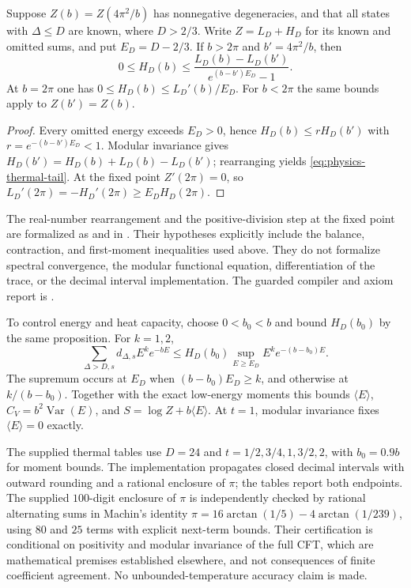 \begin{proposition}
\label{prop:physics-modular-tail}
Suppose $Z(b)=Z(4\pi^2/b)$ has nonnegative degeneracies, and that all
states with $\Delta\leq D$ are known, where $D>2/3$.  Write
$Z=L_D+H_D$ for its known and omitted sums, and put
$E_D=D-2/3$.  If $b>2\pi$ and $b'=4\pi^2/b$, then
\begin{equation}\label{eq:physics-thermal-tail}
 0\leq H_D(b)\leq
 \frac{L_D(b)-L_D(b')}{e^{(b-b')E_D}-1}.
\end{equation}
At $b=2\pi$ one has
$0\leq H_D(b)\leq L_D'(b)/E_D$.
For $b<2\pi$ the same bounds apply to $Z(b')=Z(b)$.
\end{proposition}
\begin{proof}
Every omitted energy exceeds $E_D>0$, hence
$H_D(b)\leq rH_D(b')$ with $r=e^{-(b-b')E_D}<1$.
Modular invariance gives
$H_D(b')=H_D(b)+L_D(b)-L_D(b')$; rearranging yields
\eqref{eq:physics-thermal-tail}.  At the fixed point $Z'(2\pi)=0$,
so $L_D'(2\pi)=-H_D'(2\pi)\geq E_DH_D(2\pi)$.
\end{proof}

The real-number rearrangement and the positive-division step at the
fixed point are formalized as
 and
 in
.
Their hypotheses explicitly include the balance, contraction, and
first-moment inequalities used above. They do not formalize spectral
convergence, the modular functional equation, differentiation of
the trace, or the decimal interval implementation. The guarded
compiler and axiom report is
.

To control energy and heat capacity, choose $0<b_0<b$ and bound
$H_D(b_0)$ by the same proposition.  For $k=1,2$,
\begin{equation}\label{eq:physics-moment-tail}
 \sum_{\Delta>D,s}d_{\Delta,s}E^ke^{-bE}
 \leq H_D(b_0)\sup_{E\geq E_D}E^ke^{-(b-b_0)E}.
\end{equation}
The supremum occurs at $E_D$ when $(b-b_0)E_D\geq k$, and otherwise
at $k/(b-b_0)$.  Together with the exact low-energy moments this bounds
$\langle E\rangle$, $C_V=b^2\operatorname{Var}(E)$, and
$S=\log Z+b\langle E\rangle$.  At $t=1$, modular invariance fixes
$\langle E\rangle=0$ exactly.

The supplied thermal tables use $D=24$ and
$t=1/2,3/4,1,3/2,2$, with $b_0=0.9b$ for moment bounds.
The implementation propagates closed decimal intervals with outward
rounding and a rational enclosure of $\pi$; the tables report both
endpoints. The supplied $100$-digit enclosure of $\pi$ is independently
checked by rational alternating sums in Machin's identity
$\pi=16\arctan(1/5)-4\arctan(1/239)$, using $80$ and $25$ terms
with explicit next-term bounds. Their certification is conditional on positivity and
modular invariance of the full CFT, which are mathematical premises
established elsewhere, and not consequences of finite coefficient
agreement.  No unbounded-temperature accuracy claim is made.

